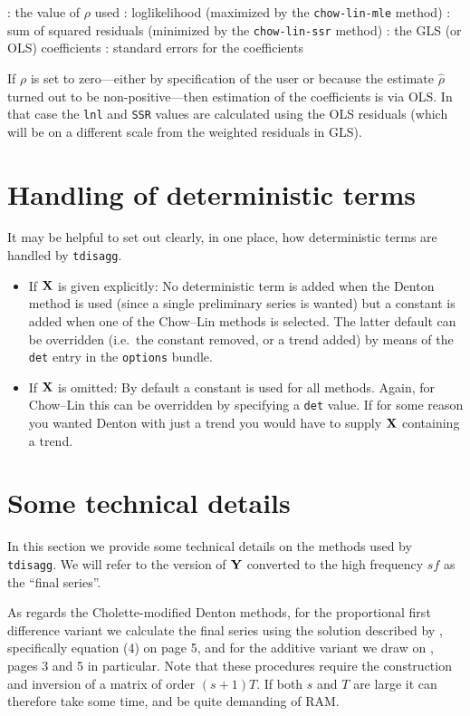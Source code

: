 \begin{description}
\begin{description}
  \tditem[rho]: the value of $\rho$ used
  \tditem[lnl]: loglikelihood (maximized by the
    \texttt{chow-lin-mle} method)
  \tditem[SSR]: sum of squared residuals (minimized by the
    \texttt{chow-lin-ssr} method)
  \tditem[coeff]: the GLS (or OLS) coefficients
  \tditem[stderr]: standard errors for the coefficients
  \end{description}
  If $\rho$ is set to zero---either by specification of the user or
  because the estimate $\hat{\rho}$ turned out to be
  non-positive---then estimation of the coefficients is via OLS. In
  that case the \texttt{lnl} and \texttt{SSR} values are calculated
  using the OLS residuals (which will be on a different scale from the
  weighted residuals in GLS).
\end{description}

\section{Handling of deterministic terms}
\label{sec:tdisagg-det}

It may be helpful to set out clearly, in one place, how deterministic
terms are handled by \texttt{tdisagg}.
\begin{itemize}
\item If $\mathbf{X}$ is given explicitly: No deterministic term is added
  when the Denton method is used (since a single preliminary series is
  wanted) but a constant is added when one of the Chow--Lin methods is
  selected. The latter default can be overridden (i.e.\ the constant
  removed, or a trend added) by means of the \texttt{det} entry in the
  \texttt{options} bundle.
\item If $\mathbf{X}$ is omitted: By default a constant is used for all
  methods. Again, for Chow--Lin this can be overridden by specifying a
  \texttt{det} value. If for some reason you wanted Denton with just a
  trend you would have to supply $\mathbf{X}$ containing a trend.
\end{itemize}

\section{Some technical details}
\label{sec:tdisagg-details}

In this section we provide some technical details on the methods used
by \texttt{tdisagg}. We will refer to the version of $\mathbf{Y}$ converted
to the high frequency $sf$ as the ``final series''.

As regards the Cholette-modified Denton methods, for the proportional
first difference variant we calculate the final series using the
solution described by \cite{difonzo2012}, specifically equation (4) on
page 5, and for the additive variant we draw on \cite{difonzo2003},
pages 3 and 5 in particular.  Note that these procedures require the
construction and inversion of a matrix of order $(s+1)T$. If both $s$
and $T$ are large it can therefore take some time, and be quite
demanding of RAM.

